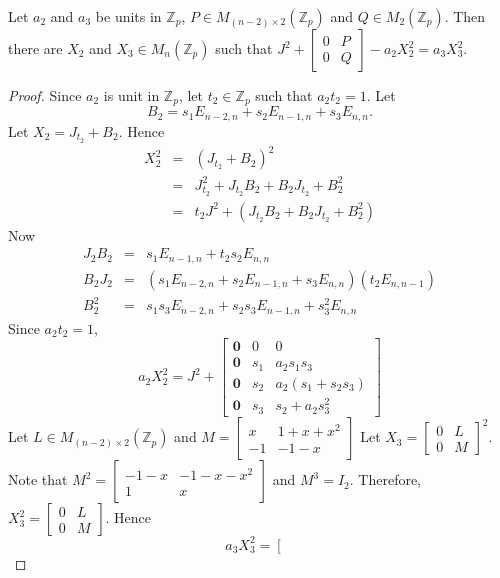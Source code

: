 \documentclass[10pt,a4paper]{amsart}
\begin{document}
	\begin{lem} \label{Lemma 2.6 for odd prime}
		Let $a_2$ and $a_3$ be units in $\mathbb{Z}_p$, $P \in M_{(n-2) \times 2}(\mathbb{Z}_p)$ and $Q \in M_2(\mathbb{Z}_p)$. Then there are $X_2$ and $X_3 \in M_n(\mathbb{Z}_p)$ such that $J^2 + \begin{bmatrix}
			0 & P\\
			0 & Q
		\end{bmatrix} - a_2X_2^2 = a_3 X_3^2 $. 
	\end{lem}

	\begin{proof}
		Since $a_2$ is unit in $\mathbb{Z}_p$, let $t_2 \in \mathbb{Z}_p$ such that $a_2t_2=1$. Let
		\begin{equation*}
			B_2 = s_1 E_{n-2,n} + s_2 E_{n-1,n} +s_3 E_{n,n}.
		\end{equation*}
		Let	$X_2 = J_{t_2} + B_2$. Hence
		\begin{eqnarray*}
		    X_2^2 &=& (J_{t_2} + B_2)^2 \\
			&=& J^2_{t_2} + J_{t_2} B_2 + B_2J_{t_2} +B_2^2 \\
			&=& t_2 J^2 + (J_{t_2} B_2 + B_2J_{t_2} +B_2^2)
		\end{eqnarray*}
		Now \begin{eqnarray*}
			J_2B_2 &=& s_1 E_{n-1,n} + t_2s_2 E_{n,n} \\
			B_2J_2 &=& (s_1 E_{n-2,n} + s_2E_{n-1,n} +s_3 E_{n,n}) (t_2 E_{n,n-1}) \\
			B_2^2 &=& s_1s_3 E_{n-2,n} + s_2s_3 E_{n-1,n} + s_3^2 E_{n,n}
		\end{eqnarray*}
		Since $a_2t_2=1$,
		\begin{equation} \label{Eq a2X2^2 for odd prime}
			a_2X_2^2 = J^2 +  \left[
			\begin{array}{c|cc}
				\textbf{0} & 0 & 0 \\ 
				\textbf{0} & s_1 & a_2s_1s_3 \\\hline
				\textbf{0} & s_2 & a_2 (s_1+s_2s_3) \\
				\textbf{0} & s_3 & s_2+ a_2s_3^2
			\end{array}
			\right]
		\end{equation}
		Let $L \in M_{(n-2) \times 2} (\mathbb{Z}_p)$ and $M = \begin{bmatrix}
			x & 1+x+x^2 \\
			-1 & -1-x
		\end{bmatrix}$
		Let $X_3 = \begin{bmatrix}
			0 & L \\
			0 & M
		\end{bmatrix}^2$. Note that $M^2 = \begin{bmatrix}
		-1-x & -1-x-x^2 \\
		1 & x
		\end{bmatrix}$ and $M^3 = I_2$. Therefore, $X_3 ^2 = \begin{bmatrix}
		0 & L \\
		0 & M
		\end{bmatrix}$. Hence
		\begin{equation} \label{Eq a3X3^2 for odd prime}
			a_3X_3^2 = \left[
			\begin{array}{c|cc}
				

\end{array}
\end{equation}
\end{proof}
\end{document}
